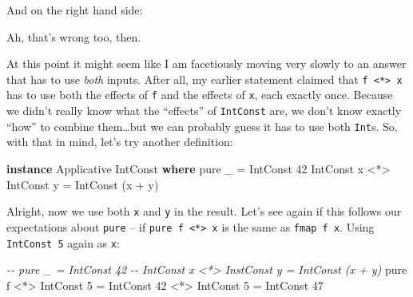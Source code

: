 \documentclass[]{article}
\newenvironment{Shaded}{}{}
\newcommand{\CommentTok}[1]{\textcolor[rgb]{0.38,0.63,0.69}{\textit{#1}}}
\newcommand{\DataTypeTok}[1]{\textcolor[rgb]{0.56,0.13,0.00}{#1}}
\newcommand{\DecValTok}[1]{\textcolor[rgb]{0.25,0.63,0.44}{#1}}
\newcommand{\FunctionTok}[1]{\textcolor[rgb]{0.02,0.16,0.49}{#1}}
\newcommand{\KeywordTok}[1]{\textcolor[rgb]{0.00,0.44,0.13}{\textbf{#1}}}
\newcommand{\NormalTok}[1]{#1}
\newcommand{\OperatorTok}[1]{\textcolor[rgb]{0.40,0.40,0.40}{#1}}
\newcommand{\OtherTok}[1]{\textcolor[rgb]{0.00,0.44,0.13}{#1}}
\begin{document}
And on the right hand side:

\begin{Shaded}
\end{Shaded}

Ah, that's wrong too, then.

At this point it might seem like I am facetiously moving very slowly to an
answer that has to use \emph{both} inputs. After all, my earlier statement
claimed that \texttt{f\ \textless{}*\textgreater{}\ x} has to use both the
effects of \texttt{f} and the effects of \texttt{x}, each exactly once. Because
we didn't really know what the ``effects'' of \texttt{IntConst} are, we don't
know exactly ``how'' to combine them\ldots but we can probably guess it has to
use both \texttt{Int}s. So, with that in mind, let's try another definition:

\begin{Shaded}
\begin{Highlighting}[]
\KeywordTok{instance} \DataTypeTok{Applicative} \DataTypeTok{IntConst} \KeywordTok{where}
    \FunctionTok{pure}\NormalTok{ \_                    }\OtherTok{=} \DataTypeTok{IntConst} \DecValTok{42}
    \DataTypeTok{IntConst}\NormalTok{ x }\OperatorTok{\textless{}*\textgreater{}} \DataTypeTok{IntConst}\NormalTok{ y }\OtherTok{=} \DataTypeTok{IntConst}\NormalTok{ (x }\OperatorTok{+}\NormalTok{ y)}
\end{Highlighting}
\end{Shaded}

Alright, now we use both \texttt{x} and \texttt{y} in the result. Let's see
again if this follows our expectations about \texttt{pure} -- if
\texttt{pure\ f\ \textless{}*\textgreater{}\ x} is the same as
\texttt{fmap\ f\ x}. Using \texttt{IntConst\ 5} again as \texttt{x}:

\begin{Shaded}
\begin{Highlighting}[]
\CommentTok{{-}{-} pure \_                     = IntConst 42}
\CommentTok{{-}{-} IntConst x \textless{}*\textgreater{} InstConst y = IntConst (x + y)}
\FunctionTok{pure}\NormalTok{ f }\OperatorTok{\textless{}*\textgreater{}} \DataTypeTok{IntConst} \DecValTok{5} \OtherTok{=} \DataTypeTok{IntConst} \DecValTok{42} \OperatorTok{\textless{}*\textgreater{}} \DataTypeTok{IntConst} \DecValTok{5}
                      \OtherTok{=} \DataTypeTok{IntConst} \DecValTok{47}
\end{Highlighting}
\end{Shaded}
\end{document}

